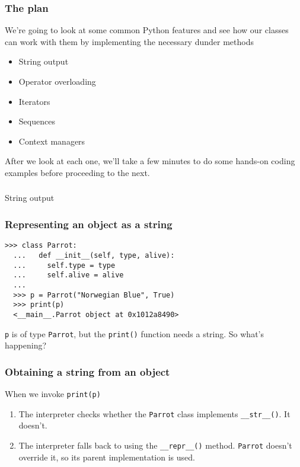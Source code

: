 \documentclass[aspectratio=169]{beamer}
\begin{document}
\begin{frame}
  \frametitle{The plan}
  
  We're going to look at some common Python features and see how our classes can work with them by implementing the necessary dunder methods
  
  \begin{itemize}
    \item String output
    \item Operator overloading
    \item Iterators
    \item Sequences
    \item Context managers
  \end{itemize}
  
  After we look at each one, we'll take a few minutes to do some hands-on coding examples before proceeding to the next.  
  \end{frame}
  
\begin{frame}
  \frametitle{} 
  \centerline{\huge String output}
 \end{frame}
 
\begin{frame}[fragile]
  \frametitle{Representing an object as a string}
  
  \begin{Verbatim}[commandchars=\\\{\}]
  >>> class Parrot:
  ...   def __init__(self, type, alive):
  ...     self.type = type
  ...     self.alive = alive
  ...
  >>> p = Parrot("Norwegian Blue", True)
  >>> print(p)
  <__main__.Parrot object at 0x1012a8490>
  \end{Verbatim}
  
  \bigbreak
  \texttt{p} is of type \texttt{Parrot}, but the \texttt{print()} function needs a string. So what's happening?
  \end{frame}
  
\begin{frame}
  \frametitle{Obtaining a string from an object} 
  
   When we invoke \texttt{print(p)}
   
   \begin{enumerate}
     \item The interpreter checks whether the \texttt{Parrot} class implements \texttt{\_\_str\_\_()}. It doesn't.
     \item The interpreter falls back to using the \texttt{\_\_repr\_\_()} method. \texttt{Parrot} doesn't override it, so its parent implementation is used.
   \end{enumerate}  
 \end{frame}
  
\end{document}
